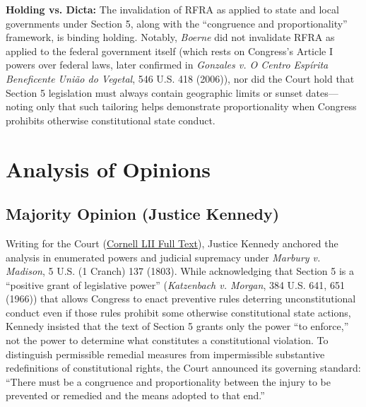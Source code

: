 \documentclass[12pt]{article}
\begin{document}
\textbf{Holding vs. Dicta:} The invalidation of RFRA as applied to state and local governments under Section 5, along with the ``congruence and proportionality'' framework, is binding holding. Notably, \textit{Boerne} did not invalidate RFRA as applied to the federal government itself (which rests on Congress's Article I powers over federal laws, later confirmed in \textit{Gonzales v. O Centro Esp\'{i}rita Beneficente Uni\~{a}o do Vegetal}, 546 U.S. 418 (2006)), nor did the Court hold that Section 5 legislation must always contain geographic limits or sunset dates---noting only that such tailoring helps demonstrate proportionality when Congress prohibits otherwise constitutional state conduct.

\section{Analysis of Opinions}

\subsection{Majority Opinion (Justice Kennedy)}

Writing for the Court (\href{https://www.law.cornell.edu/supct/html/95-2074.ZO.html}{Cornell LII Full Text}), Justice Kennedy anchored the analysis in enumerated powers and judicial supremacy under \textit{Marbury v. Madison}, 5 U.S. (1 Cranch) 137 (1803). While acknowledging that Section 5 is a ``positive grant of legislative power'' (\textit{Katzenbach v. Morgan}, 384 U.S. 641, 651 (1966)) that allows Congress to enact preventive rules deterring unconstitutional conduct even if those rules prohibit some otherwise constitutional state actions, Kennedy insisted that the text of Section 5 grants only the power ``to enforce,'' not the power to determine what constitutes a constitutional violation. To distinguish permissible remedial measures from impermissible substantive redefinitions of constitutional rights, the Court announced its governing standard: ``There must be a congruence and proportionality between the injury to be prevented or remedied and the means adopted to that end.''
\end{document}

